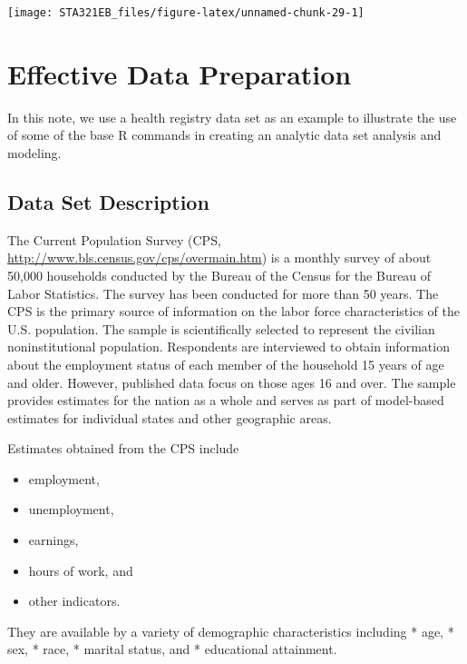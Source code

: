 \documentclass[
]{book}
\providecommand{\tightlist}{%
  \setlength{\itemsep}{0pt}\setlength{\parskip}{0pt}}
\begin{document}
\begin{center}\texttt{[image: STA321EB\_files/figure-latex/unnamed-chunk-29-1]} \end{center}

\hypertarget{effective-data-preparation}{%
\chapter{Effective Data Preparation}\label{effective-data-preparation}}

In this note, we use a health registry data set as an example to illustrate the use of some of the base R commands in creating an analytic data set analysis and modeling.

\hypertarget{data-set-description}{%
\section{Data Set Description}\label{data-set-description}}

The Current Population Survey (CPS, \url{http://www.bls.census.gov/cps/overmain.htm}) is a monthly survey of about 50,000 households conducted by the Bureau of the Census for the Bureau of Labor Statistics. The survey has been conducted for more than 50 years. The CPS is the primary source of information on the labor force characteristics of the U.S. population. The sample is scientifically selected to represent the civilian noninstitutional population. Respondents are interviewed to obtain information about the employment status of each member of the household 15 years of age and older. However, published data focus on those ages 16 and over. The sample provides estimates for the nation as a whole and serves as part of model-based estimates for individual states and other geographic areas.

Estimates obtained from the CPS include

\begin{itemize}
\tightlist
\item
  employment,
\item
  unemployment,
\item
  earnings,
\item
  hours of work, and
\item
  other indicators.
\end{itemize}

They are available by a variety of demographic characteristics including
* age,
* sex,
* race,
* marital status, and
* educational attainment.
\end{document}
